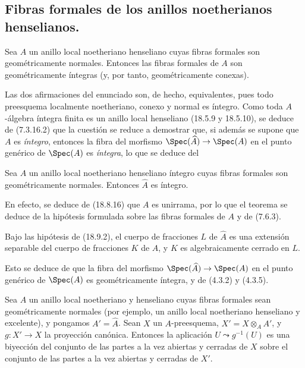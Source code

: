 \subsection{Fibras formales de los anillos noetherianos henselianos.}
\label{subsection:IV.18.9}

\begin{theorem}[18.9.1]
\label{IV.18.9.1}
Sea $A$ un anillo local noetheriano henseliano cuyas fibras formales son geométricamente normales. Entonces las fibras formales de $A$ son geométricamente íntegras \textup{(y, por tanto,} geométricamente conexas\textup{)}.
\end{theorem}

Las dos afirmaciones del enunciado son, de hecho, equivalentes, pues todo preesquema localmente noetheriano, conexo y normal es íntegro. Como toda $A$-álgebra íntegra finita es un anillo local henseliano (18.5.9 y 18.5.10), se deduce de (7.3.16.2) que la cuestión se reduce a demostrar que, si además se supone que $A$ es \emph{íntegro}, entonces la fibra del morfismo $\Spec(\widehat A)\to\Spec(A)$ en el punto genérico de $\Spec(A)$ es \emph{íntegra}, lo que se deduce del

\begin{corollary}[18.9.2]
\label{IV.18.9.2}
Sea $A$ un anillo local noetheriano henseliano íntegro cuyas fibras formales son geométricamente normales. Entonces $\widehat A$ es íntegro.
\end{corollary}

En efecto, se deduce de (18.8.16) que $A$ es unirrama, por lo que el teorema se deduce de la hipótesis formulada sobre las fibras formales de $A$ y de (7.6.3).

\begin{corollary}[18.9.3]
\label{IV.18.9.3}
Bajo las hipótesis de \textup{(18.9.2)}, el cuerpo de fracciones $L$ de $\widehat A$ es una extensión separable del cuerpo de fracciones $K$ de $A$, y $K$ es algebraicamente cerrado en $L$.
\end{corollary}

Esto se deduce de que la fibra del morfismo $\Spec(\widehat A)\to\Spec(A)$ en el punto genérico de $\Spec(A)$ es geométricamente íntegra, y de (4.3.2) y (4.3.5).

\begin{corollary}[18.9.4]
\label{IV.18.9.4}
Sea $A$ un anillo local noetheriano y henseliano cuyas fibras formales sean geométricamente normales \textup{(por ejemplo, un anillo local noetheriano henseliano y} excelente\textup{)}, y pongamos $A'=\widehat A$. Sean $X$ un $A$-preesquema, $X'=X\otimes_A A'$, y $g:X'\to X$ la proyección canónica. Entonces la aplicación $U\leadsto g^{-1}(U)$ es una biyección del conjunto de las partes a la vez abiertas y cerradas de $X$ sobre el conjunto de las partes a la vez abiertas y cerradas de $X'$.
\end{corollary}

